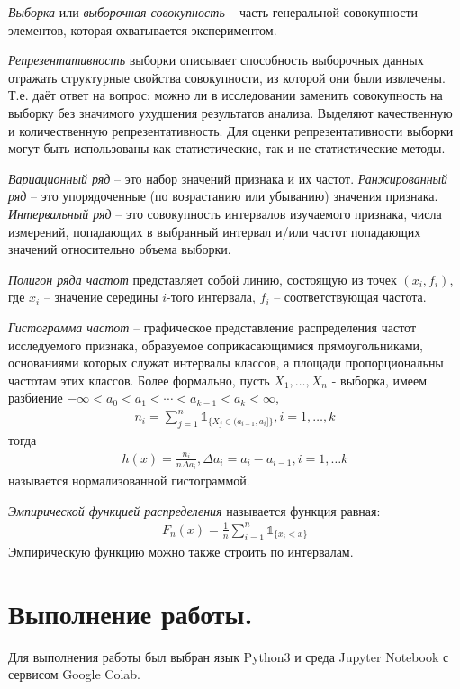 \textit{Выборка} или \textit{выборочная совокупность} -- часть генеральной совокупности элементов, которая охватывается экспериментом.

\textit{Репрезентативность} выборки описывает способность выборочных данных отражать структурные свойства совокупности, из которой они были извлечены. Т.е. даёт ответ на вопрос: можно ли в исследовании заменить совокупность на выборку без значимого ухудшения результатов анализа.
Выделяют качественную и количественную репрезентативность.
Для оценки репрезентативности выборки могут быть использованы как статистические,
так и не статистические методы.

\textit{Вариационный ряд} -- это набор значений признака и их частот.
\textit{Ранжированный ряд} -- это упорядоченные (по возрастанию или убыванию) значения признака.
\textit{Интервальный ряд} -- это совокупность интервалов изучаемого признака, числа измерений, попадающих в выбранный интервал и/или
частот попадающих значений относительно объема выборки.

\textit{Полигон ряда частот} представляет собой линию, состоящую из точек $(x_i, f_i)$,
где $x_i$ -- значение середины $i$-того интервала, $f_i$ -- соответствующая частота.

\textit{Гистограмма частот} -- графическое представление распределения частот исследуемого
признака, образуемое соприкасающимися прямоугольниками, основаниями которых служат интервалы классов, а площади пропорциональны частотам этих классов.
Более формально, пусть $X_1, \dots, X_n$ - выборка, имеем разбиение $-\infty < a_0 < a_1 < \cdots < a_{k-1} < a_k < \infty$,
\begin{gather*}
    n_i = \sum_{j=1}^n \mathds{1}_{\{X_j \in (a_{i-1}, a_i]\}}, i = 1, \dots, k
\end{gather*}
тогда
\begin{gather*}
    h(x) = \frac{n_i}{n\Delta a_i}, \Delta a_i = a_i - a_{i-1}, i = 1, \dots k
\end{gather*}
называется нормализованной гистограммой.

\textit{Эмпирической функцией распределения} называется функция равная:
\begin{gather*}
    F_n(x) = \frac{1}{n} \sum_{i=1}^n \mathds{1}_{\{x_i < x\}}
\end{gather*}
Эмпирическую функцию можно также строить по интервалам.

\section*{Выполнение работы.}
Для выполнения работы был выбран язык Python3 и среда Jupyter Notebook с сервисом
Google Colab.

